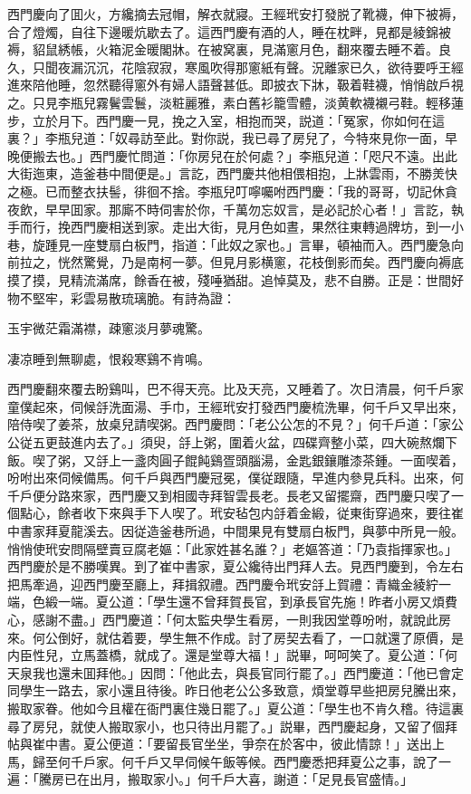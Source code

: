 西門慶向了囬火，方纔摘去冠帽，解衣就寢。王經玳安打發脱了靴襪，伸下被褥，合了燈燭，自往下邊暖炕歇去了。這西門慶有酒的人，睡在枕畔，見都是綾錦被褥，貂鼠綉帳，火箱泥金暖閣牀。在被窝裏，見滿窻月色，翻來覆去睡不着。良久，只聞夜漏沉沉，花陰寂寂，寒風吹得那窻紙有聲。況離家已久，欲待要呼王經進來陪他睡，忽然聽得窻外有婦人語聲甚低。即披衣下牀，靸着鞋襪，悄悄啟戶視之。只見李瓶兒霧鬢雲鬟，淡粧麗雅，素白舊衫籠雪體，淡黄軟襪襯弓鞋。輕移蓮步，立於月下。西門慶一見，挽之入室，相抱而哭，説道：「冤家，你如何在這裏？」李瓶兒道：「奴尋訪至此。對你説，我已尋了房兒了，今特來見你一面，早晚便搬去也。」西門慶忙問道：「你房兒在於何處？」李瓶兒道：「咫尺不遠。出此大街迤東，造釜巷中間便是。」言訖，西門慶共他相偎相抱，上牀雲雨，不勝羙快之極。已而整衣扶髻，徘徊不捨。李瓶兒叮嚀囑咐西門慶：「我的哥哥，切記休貪夜飲，早早囬家。那廝不時伺害於你，千萬勿忘奴言，是必記於心者！」言訖，執手而行，挽西門慶相送到家。走出大街，見月色如晝，果然往東轉過牌坊，到一小巷，旋踵見一座雙扇白板門，指道：「此奴之家也。」言畢，頓袖而入。西門慶急向前拉之，恍然驚覺，乃是南柯一夢。但見月影横窻，花枝倒影而矣。西門慶向褥底摸了摸，見精流滿席，餘香在被，殘唾猶甜。追悼莫及，悲不自勝。正是：世間好物不堅牢，彩雲易散琉璃脆。有詩為證：

\begin{myquote}
玉宇微茫霜滿襟，疎窻淡月夢魂驚。

凄凉睡到無聊處，恨殺寒鷄不肯鳴。
\end{myquote}

西門慶翻來覆去盼鷄叫，巴不得天亮。比及天亮，又睡着了。次日清晨，何千戶家童僕起來，伺候㧱洗面湯、手巾，王經玳安打發西門慶梳洗畢，何千戶又早出來，陪侍喫了姜茶，放桌兒請喫粥。西門慶問：「老公公怎的不見？」何千戶道：「家公公従五更鼓進内去了。」須臾，㧱上粥，圍着火盆，四碟齊整小菜，四大碗熬爛下飯。喫了粥，又㧱上一盞肉圓子餛飩鷄疍頭腦湯，金匙銀鑲雕漆茶鍾。一面喫着，吩咐出來伺候備馬。何千戶與西門慶冠冕，僕従跟隨，早進内參見兵科。出來，何千戶便分路來家，西門慶又到相國寺拜智雲長老。長老又留擺齋，西門慶只喫了一個點心，餘者收下來與手下人喫了。玳安毡包内㧱着金緞，従東街穿過來，要往崔中書家拜夏龍溪去。因従造釜巷所過，中間果見有雙扇白板門，與夢中所見一般。悄悄使玳安問隔壁賣豆腐老嫗：「此家姓甚名誰？」老嫗答道：「乃袁指揮家也。」西門慶於是不勝嘆異。到了崔中書家，夏公纔待出門拜人去。見西門慶到，令左右把馬牽過，迎西門慶至廳上，拜揖叙禮。西門慶令玳安㧱上賀禮：青織金綾紵一端，色緞一端。夏公道：「學生還不曾拜賀長官，到承長官先施！昨者小房又煩費心，感謝不盡。」西門慶道：「何太監央學生看房，一則我因堂尊吩咐，就說此房來。何公倒好，就估着要，學生無不作成。討了房契去看了，一口就還了原價，是内臣性兒，立馬蓋橋，就成了。還是堂尊大福！」説畢，呵呵笑了。夏公道：「何天泉我也還未囬拜他。」因問：「他此去，與長官同行罷了。」西門慶道：「他已會定同學生一路去，家小還且待後。昨日他老公公多致意，煩堂尊早些把房兒騰出來，搬取家眷。他如今且權在衙門裏住幾日罷了。」夏公道：「學生也不肯久稽。待這裏尋了房兒，就使人搬取家小，也只待出月罷了。」説畢，西門慶起身，又留了個拜帖與崔中書。夏公便道：「要留長官坐坐，爭奈在於客中，彼此情諒！」送出上馬，歸至何千戶家。何千戶又早伺候午飯等候。西門慶悉把拜夏公之事，說了一遍：「騰房已在出月，搬取家小。」何千戶大喜，謝道：「足見長官盛情。」

